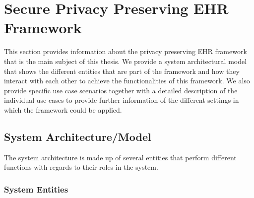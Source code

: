 \section{Secure Privacy Preserving EHR Framework}

This section provides information about the privacy preserving EHR framework that is the main subject of this thesis. We provide a system architectural model that shows the different entities that are part of the framework and how they interact with each other to achieve the functionalities of this framework. We also provide specific use case scenarios together with a detailed description of the individual use cases to provide further information of the different settings in which the framework could be applied.

\subsection{System Architecture/Model}

The system architecture is made up of several entities that perform different functions with regards to their roles in the system.

\subsubsection{System Entities}

